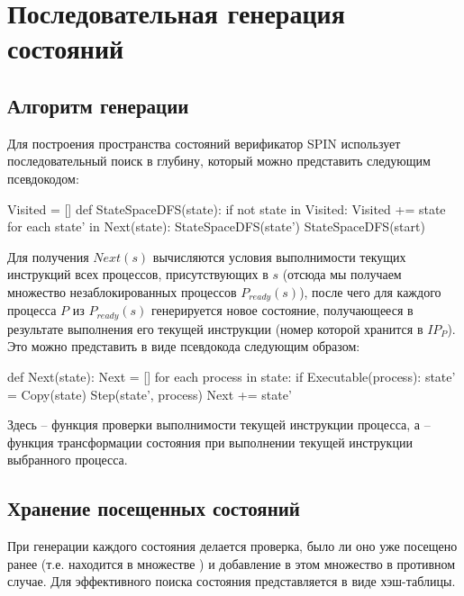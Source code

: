 \chapter{Последовательная генерация состояний}
\label{sec:seq-statespace}

\section{Алгоритм генерации}
\label{sec:seq-algo}

Для построения пространства состояний верификатор SPIN использует последовательный поиск в
глубину, который можно представить следующим псевдокодом:

\begin{CodeBlock}
Visited = []
def StateSpaceDFS(state):
    if not state in Visited:
        Visited += state
        for each state' in Next(state):
            StateSpaceDFS(state')
StateSpaceDFS(start)
\end{CodeBlock}

Для получения $Next(s)$ вычисляются условия выполнимости текущих инструкций всех
процессов, присутствующих в $s$ (отсюда мы получаем множество незаблокированных процессов
$P_{ready}(s)$), после чего для каждого процесса $P$ из $P_{ready}(s)$ генерируется новое
состояние, получающееся в результате выполнения его текущей инструкции (номер которой
хранится в $IP_P$). Это можно представить в виде псевдокода следующим образом:

\begin{CodeBlock}
def Next(state):
    Next = []
    for each process in state:
        if Executable(process):
            state' = Copy(state)
            Step(state', process)
            Next += state'
\end{CodeBlock}

Здесь  -- функция проверки выполнимости текущей инструкции процесса, а
 -- функция трансформации состояния при выполнении текущей инструкции
выбранного процесса.

\section{Хранение посещенных состояний}
\label{sec:state-hashing}

При генерации каждого состояния делается проверка, было ли оно уже посещено ранее
(т.е. находится в множестве ) и добавление в этом множество в противном
случае. Для эффективного поиска состояния  представляется в виде
хэш-таблицы.

